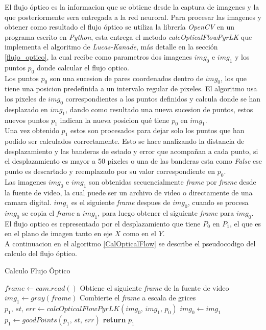 \documentclass{iccmemoria}
\begin{document}
El flujo óptico es la informacion que se obtiene desde la captura de imagenes y la que posteriormente sera entregada a la red neuroral. Para procesar las imagenes y obtener como resultado el flujo óptico se utiliza la librería \emph{OpenCV} en un programa escrito en \emph{Python}, esta entrega el metodo \emph{calcOpticalFlowPyrLK} que implementa el algoritmo de \emph{Lucas-Kanade}, más detalle en la sección \ref{flujo_optico}, la cual recibe como parametros dos imagenes $img_0$ e $img_1$ y los puntos $p_0$ donde calcular el flujo optico.\\

Los puntos $p_0$ son una sucesion de pares coordenados dentro de $img_0$, los que tiene una posicion predefinida a un intervalo regular de pixeles. El algoritmo usa los pixeles de $img_0$ correspondientes a los puntos definidos y calcula donde se han desplazado en $img_1$, dando como resultado una nueva sucesion de puntos, estos nuevos puntos $p_1$ indican la nueva posicion qué tiene $p_0$ en $img_1$.\\

Una vez obtenido $p_1$ estos son procesados para dejar solo los puntos que han podido ser calculados correctamente. Esto se hace analizando la distancia de desplazamiento y las banderas de estado y error que acompañan a cada punto, si el desplazamiento es mayor a 50 pixeles o una de las banderas esta como \emph{False} ese punto es descartado y reemplazado por su valor correspondiente en $p_0$.\\

Las imagenes $img_0$ e $img_1$ son obtenidas secuencialmente \emph{frame} por \emph{frame} desde la fuente de video, la cual puede ser un archivo de video o directamente de una camara digital. $img_1$ es el siguiente \emph{frame} despues de $img_0$, cuando se procesa $img_0$ se copia el \emph{frame} a $img_1$, para luego obtener el siguiente \emph{frame} para $img_0$.\\

El flujo optico es representado por el desplazamiento que tiene $P_0$ en $P_1$, el que es en el plano de imagen tanto en eje $X$ como en el $Y$.\\

A continuacion en el algoritmo \ref{CalOpticalFlow} se describe el pseudocodigo del calculo del flujo óptico.

\begin{algorithm}
\caption{Calculo Flujo Óptico}\label{CalOpticalFlow}
\begin{algorithmic}[1]
\State $frame \gets cam.read()$ \Comment Obtiene el siguiente \emph{frame} de la fuente de video
\State $img_1 \gets gray(frame)$ \Comment Combierte el \emph{frame} a escala de grices
\State $p_1,\, st,\, err \gets calcOpticalFlowPyrLK(img_0,\, img_1,\, p_0) $
\State $img_0 \gets img_1$
\State $p_1 \gets goodPoints(p_1,\, st,\, err)$ \Comment 
\State \textbf{return} $p_1$

\EndFunction
\end{algorithmic}
\end{algorithm}
 
\end{document}
